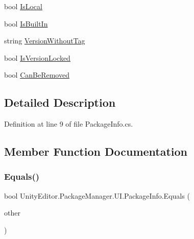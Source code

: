 \begin{DoxyCompactItemize}
\item 
bool \mbox{\hyperlink{class_unity_editor_1_1_package_manager_1_1_u_i_1_1_package_info_a6e1e74a584df08d2c48c09ba3a9cc5a2}{Is\+Local}}
\item 
bool \mbox{\hyperlink{class_unity_editor_1_1_package_manager_1_1_u_i_1_1_package_info_a50613d88f03b92be0f684dd372a39007}{Is\+Built\+In}}
\item 
string \mbox{\hyperlink{class_unity_editor_1_1_package_manager_1_1_u_i_1_1_package_info_a6ee0efc0cc759fedb012c3ffe8addc9d}{Version\+Without\+Tag}}
\item 
bool \mbox{\hyperlink{class_unity_editor_1_1_package_manager_1_1_u_i_1_1_package_info_a5316302ed3e9bd712fb403b214e522d0}{Is\+Version\+Locked}}
\item 
bool \mbox{\hyperlink{class_unity_editor_1_1_package_manager_1_1_u_i_1_1_package_info_afbe46ed45242654d28a36570162f0bd4}{Can\+Be\+Removed}}
\end{DoxyCompactItemize}


\subsection{Detailed Description}


Definition at line 9 of file Package\+Info.\+cs.



\subsection{Member Function Documentation}
\mbox{\label{class_unity_editor_1_1_package_manager_1_1_u_i_1_1_package_info_a1f6449337b576d780dca5a6ba90c6177}} 
\subsubsection{\texorpdfstring{Equals()}{Equals()}}
{\footnotesize\ttfamily bool Unity\+Editor.\+Package\+Manager.\+U\+I.\+Package\+Info.\+Equals (\begin{DoxyParamCaption}\item[{\mbox{\hyperlink{class_unity_editor_1_1_package_manager_1_1_u_i_1_1_package_info}{Package\+Info}}}]{other }\end{DoxyParamCaption})}




